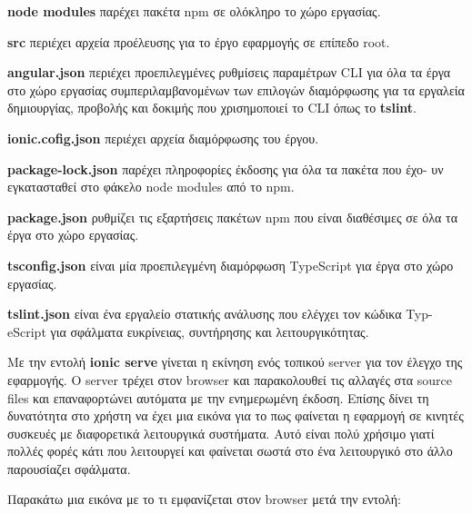 \documentclass[a4paper,12pt]{article}
\begin{document}
					\textbf{node modules} παρέχει πακέτα npm σε ολόκληρο το χώρο εργασίας.
					
					\textbf{src} περιέχει αρχεία προέλευσης για το έργο εφαρμογής σε επίπεδο root.
					
					\textbf{angular.json} περιέχει προεπιλεγμένες ρυθμίσεις παραμέτρων CLI για όλα 
					τα έργα στο χώρο 
					εργασίας συμπεριλαμβανομένων των επιλογών διαμόρφωσης για τα εργαλεία δημιουργίας, προβολής και δοκιμής που χρισημοποιεί
					το CLI όπως το \textbf{tslint}.

					\textbf{ionic.cofig.json} περιέχει αρχεία διαμόρφωσης του έργου.	

					\textbf{package-lock.json} παρέχει πληροφορίες έκδοσης για όλα τα πακέτα που έχο-
					υν εγκατασταθεί στο φάκελο node modules 
					από το npm. 

					\textbf{package.json} ρυθμίζει τις εξαρτήσεις πακέτων npm που είναι διαθέσιμες σε όλα τα έργα στο χώρο εργασίας. 

					\textbf{tsconfig.json} είναι μία προεπιλεγμένη διαμόρφωση TypeScript για έργα στο χώρο εργασίας.

					\textbf{tslint.json} είναι ένα εργαλείο στατικής ανάλυσης που ελέγχει τον κώδικα Typ-
					eScript για σφάλματα ευκρίνειας, συντήρησης και λειτουργικότητας.
					\newpage

					Με την εντολή \textbf{ionic serve} γίνεται η εκίνηση ενός τοπικού server για τον έλεγχο της εφαρμογής. Ο server τρέχει στον browser και παρακολουθεί 
					τις αλλαγές στα source files και επαναφορτώνει αυτόματα με την ενημερωμένη έκδοση. Επίσης δίνει τη δυνατότητα στο χρήστη να έχει μια εικόνα για το
					πως φαίνεται η εφαρμογή σε κινητές συσκευές με διαφορετικά λειτουργικά συστήματα. Αυτό είναι πολύ χρήσιμο γιατί πολλές φορές κάτι που λειτουργεί και φαίνεται 
					σωστά στο ένα λειτουργικό στο άλλο παρουσίαζει σφάλματα.

					Παρακάτω μια εικόνα με το τι εμφανίζεται στον browser μετά την εντολή:
					\vspace*{1cm}
					
\end{document}
